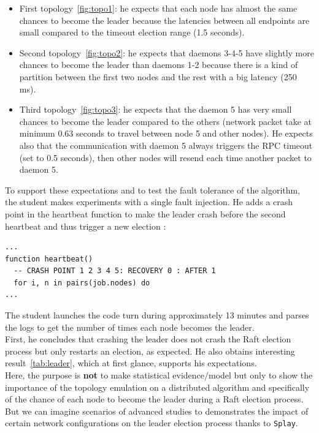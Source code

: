 \documentclass{eplmastersthesis}
\begin{document}
          \begin{itemize}
            \item First topology~\ref{fig:topo1}: he expects that each node
            has almost the same chances to become the leader because the
            latencies between all endpoints are small compared to the timeout
            election range (1.5 seconds).
            \item Second topology~\ref{fig:topo2}: he expects that daemons
            3-4-5 have slightly more chances to become the leader
            than daemons 1-2 because there is a kind of partition between the
            first two nodes and the rest with a big latency (250 ms).
            \item Third topology~\ref{fig:topo3}: he expects that the daemon
            5 has very small chances to become the leader compared to the
            others (network packet take at minimum 0.63 seconds to travel between node 5 and other nodes).
            He expects also that the communication with daemon 5 always
            triggers the RPC timeout (set to 0.5 seconds), then other nodes will resend each
            time another packet to daemon 5.
          \end{itemize}

          To support these expectations and to test the fault tolerance of
          the algorithm, the student makes experiments with a single fault
          injection. He adds a crash point in the heartbeat function to
          make the leader crash before the second heartbeat and
          thus trigger a new election :

          \begin{lstlisting}[style=MyLua]
...
function heartbeat()
  -- CRASH POINT 1 2 3 4 5: RECOVERY 0 : AFTER 1
  for i, n in pairs(job.nodes) do
...
          \end{lstlisting}

          The student launches the code turn during approximately 13 minutes
          and parses the logs to get the number of times each node becomes the
          leader.\\
          First, he concludes that crashing the leader does not crash the
          Raft election process but only restarts an election, as expected.
          He also obtains interesting result~\ref{tab:leader}, which at first glance,
          supports his expectations. \\
          Here, the purpose is \textbf{not} to make statistical evidence/model but
          only to show the importance of the topology emulation on a
          distributed algorithm and specifically of the chance of each node
          to become the leader during a Raft election process.\\
          But we can imagine scenarios of advanced studies to demonstrates
          the impact of certain network configurations on the leader election
          process thanks to \texttt{Splay}.\\
\end{document}
